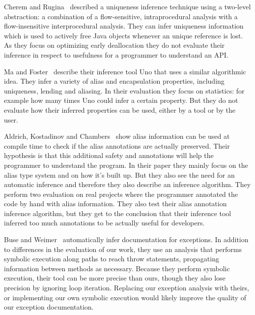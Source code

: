 
Cherem and Rugina~\cite{UniquenessInference} described a uniqueness inference
technique using a two-level abstraction: a combination of a flow-sensitive,
intraprocedural analysis with a flow-insensitive interprocedural analysis. 
They can infer uniqueness information which is used to actively free Java
objects whenever an unique reference is lost. As they focus on optimizing 
early deallocation they do not evaluate their inference in respect to usefulness
for a programmer to understand an API.

Ma and Foster~\cite{Uno} describe their inference tool Uno that uses a similar
algorithmic idea. They infer a variety of alias and encapsulation
properties, including uniqueness, lending and aliasing. In their evaluation
they focus on statistics: for example how many times Uno could infer a certain property.
But they do not evaluate how their inferred properties can be used, either by a tool
or by the user.

Aldrich, Kostadinov and Chambers~\cite{AliasJava} show alias information 
can be used at compile time to check if the alias annotations are actually
preserved. Their hypothesis is that this additional safety and annotations will
help the programmer to understand the program. In their paper they mainly focus
on the alias type system and on how it's built up. But they also see the need
for an automatic inference and therefore they also describe an inference algorithm.
They perform two evaluation on real projects where the programmer
annotated the code by hand with alias information. They also test their
alias annotation inference algorithm, but they get to the conclusion that
their inference tool inferred too much annotations to be actually useful
for developers.

Buse and Weimer~\cite{autodoc} automatically infer documentation for
exceptions.  In addition to differences in the evaluation of our work, they use
an analysis that performs symbolic execution along paths to reach throw
statements, propagating information between methods as necessary.
Because they
perform symbolic execution, their tool can be more precise than ours, though
they also lose precision by ignoring loop iteration.
Replacing our exception analysis with theirs, or implementing our own symbolic
execution would likely improve the quality of our exception documentation.
